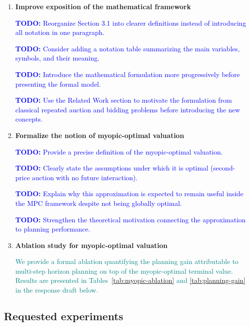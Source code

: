 \documentclass[11pt]{article}
\newcommand{\todo}[1]{\textcolor{blue}{\textbf{TODO:} #1}}
\newcommand{\done}[1]{\textcolor{teal}{#1}}
\begin{document}
\begin{enumerate}[leftmargin=*]

\item \textbf{Improve exposition of the mathematical framework}

\todo{Reorganize Section 3.1 into clearer definitions instead of introducing all notation in one paragraph.}

\todo{Consider adding a notation table summarizing the main variables, symbols, and their meaning.}

\todo{Introduce the mathematical formulation more progressively before presenting the formal model.}

\todo{Use the Related Work section to motivate the formulation from classical repeated auction and bidding problems before introducing the new concepts.}

\item \textbf{Formalize the notion of myopic-optimal valuation}

\todo{Provide a precise definition of the myopic-optimal valuation.}

\todo{Clearly state the assumptions under which it is optimal (second-price auction with no future interaction).}

\todo{Explain why this approximation is expected to remain useful inside the MPC framework despite not being globally optimal.}

\todo{Strengthen the theoretical motivation connecting the approximation to planning performance.}

\item \textbf{Ablation study for myopic-optimal valuation}

\done{We provide a formal ablation quantifying the planning gain attributable to multi-step
      horizon planning on top of the myopic-optimal terminal value.  Results are presented
      in Tables~\ref{tab:myopic-ablation} and \ref{tab:planning-gain} in the response
      draft below.}

\end{enumerate}

\subsection*{Requested experiments}
\end{document}
